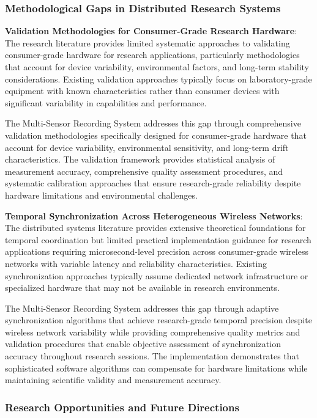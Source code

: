 \documentclass[12pt,a4paper]{article}
\begin{document}
\subsubsection{Methodological Gaps in Distributed Research Systems}

\textbf{Validation Methodologies for Consumer-Grade Research Hardware}: The research literature provides limited systematic
approaches to validating consumer-grade hardware for research applications, particularly methodologies that account for
device variability, environmental factors, and long-term stability considerations. Existing validation approaches
typically focus on laboratory-grade equipment with known characteristics rather than consumer devices with significant
variability in capabilities and performance.

The Multi-Sensor Recording System addresses this gap through comprehensive validation methodologies specifically
designed for consumer-grade hardware that account for device variability, environmental sensitivity, and long-term drift
characteristics. The validation framework provides statistical analysis of measurement accuracy, comprehensive quality
assessment procedures, and systematic calibration approaches that ensure research-grade reliability despite hardware
limitations and environmental challenges.

\textbf{Temporal Synchronization Across Heterogeneous Wireless Networks}: The distributed systems literature provides
extensive theoretical foundations for temporal coordination but limited practical implementation guidance for research
applications requiring microsecond-level precision across consumer-grade wireless networks with variable latency and
reliability characteristics. Existing synchronization approaches typically assume dedicated network infrastructure or
specialized hardware that may not be available in research environments.

The Multi-Sensor Recording System addresses this gap through adaptive synchronization algorithms that achieve
research-grade temporal precision despite wireless network variability while providing comprehensive quality metrics and
validation procedures that enable objective assessment of synchronization accuracy throughout research sessions. The
implementation demonstrates that sophisticated software algorithms can compensate for hardware limitations while
maintaining scientific validity and measurement accuracy.

\subsubsection{Research Opportunities and Future Directions}
\end{document}
